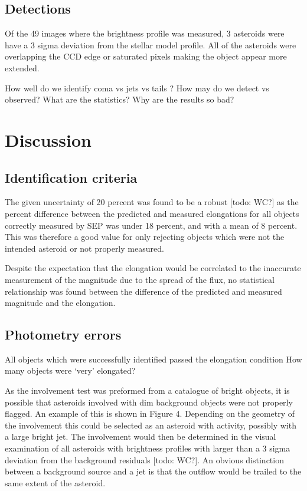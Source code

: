 \documentclass[iop,apj]{emulateapj}
\begin{document}
\subsection{Detections}

Of the 49 images where the brightness profile was measured, 3 asteroids were have a 3 sigma deviation from the stellar model profile. All of the asteroids were overlapping the CCD edge or saturated pixels making the object appear more extended.

How well do we identify coma vs jets vs tails ? How may do we detect vs observed? What are the statistics? Why are the results so bad?

\section{Discussion}

\subsection{Identification criteria}

The given uncertainty of 20 percent was found to be a robust [todo: WC?] as the percent difference between the predicted and measured elongations for all objects correctly measured by SEP was under 18 percent, and with a mean of 8 percent. This was therefore a good value for only rejecting objects which were not the intended asteroid or not properly measured.

Despite the expectation that the elongation would be correlated to the inaccurate measurement of the magnitude due to the spread of the flux, no statistical relationship was found between the difference of the predicted and measured magnitude and the elongation.

\subsection{Photometry errors}



All objects which were successfully identified passed the elongation condition
How many objects were `very' elongated?


As the involvement test was preformed from a catalogue of bright objects, it is possible that asteroids involved with dim background objects were not properly flagged. An example of this is shown in Figure 4. Depending on the geometry of the involvement this could be selected as an asteroid with activity, possibly with a large bright jet. The involvement would then be determined in the visual examination of all asteroids with brightness profiles with larger than a 3 sigma deviation from the background residuals [todo: WC?]. An obvious distinction between a background source and a jet is that the outflow would be trailed to the same extent of the asteroid.
\end{document}
